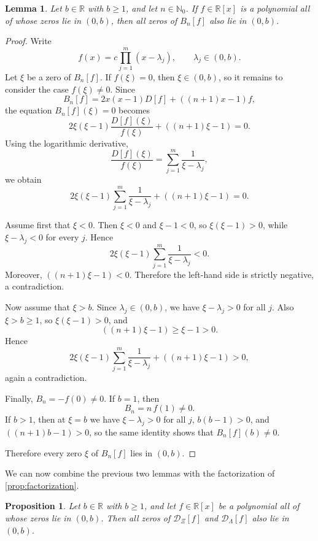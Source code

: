 \documentclass[11pt,twoside]{article}
\newtheorem{lemma}[theorem]{Lemma}
\newtheorem{proposition}[theorem]{Proposition}
\numberwithin{equation}{section}
\begin{document}
\begin{lemma}\label{lem:Bn-interval-0b}
Let \(b\in\mathbb R\) with \(b\ge 1\), and let \(n\in\mathbb N_0\). If \(f\in\mathbb R[x]\) is a polynomial all of whose zeros lie in \((0,b)\), then all zeros of \(B_n[f]\) also lie in \((0,b)\).
\end{lemma}

\begin{proof}
Write
\[
f(x)=c\prod_{j=1}^m (x-\lambda_j),
\qquad \lambda_j\in(0,b).
\]
Let \(\xi\) be a zero of \(B_n[f]\). If \(f(\xi)=0\), then \(\xi\in(0,b)\), so it remains to consider the case \(f(\xi)\neq 0\). Since
\[
B_n[f]=2x(x-1)D[f]+((n+1)x-1)f,
\]
the equation \(B_n[f](\xi)=0\) becomes
\[
2\xi(\xi-1)\frac{D[f](\xi)}{f(\xi)}+((n+1)\xi-1)=0.
\]
Using the logarithmic derivative,
\[
\frac{D[f](\xi)}{f(\xi)}
=
\sum_{j=1}^m \frac{1}{\xi-\lambda_j},
\]
we obtain
\[
2\xi(\xi-1)\sum_{j=1}^m \frac{1}{\xi-\lambda_j}+((n+1)\xi-1)=0.
\]

Assume first that \(\xi<0\). Then \(\xi<0\) and \(\xi-1<0\), so \(\xi(\xi-1)>0\), while \(\xi-\lambda_j<0\) for every \(j\). Hence
\[
2\xi(\xi-1)\sum_{j=1}^m \frac{1}{\xi-\lambda_j}<0.
\]
Moreover, \(((n+1)\xi-1)<0\). Therefore the left-hand side is strictly negative, a contradiction.

Now assume that \(\xi>b\). Since \(\lambda_j\in(0,b)\), we have \(\xi-\lambda_j>0\) for all \(j\). Also \(\xi>b\ge1\), so \(\xi(\xi-1)>0\), and
\[
((n+1)\xi-1)\ge \xi-1>0.
\]
Hence
\[
2\xi(\xi-1)\sum_{j=1}^m \frac{1}{\xi-\lambda_j}+((n+1)\xi-1)>0,
\]
again a contradiction.

Finally, \(B_n=-f(0)\neq0\). If \(b=1\), then
\[
B_n=n\,f(1)\neq0.
\]
If \(b>1\), then at \(\xi=b\) we have \(\xi-\lambda_j>0\) for all \(j\), \(b(b-1)>0\), and \(((n+1)b-1)>0\), so the same identity shows that \(B_n[f](b)\neq0\).

Therefore every zero \(\xi\) of \(B_n[f]\) lies in \((0,b)\).
\end{proof}

We can now combine the previous two lemmas with the factorization of \cref{prop:factorization}.

\begin{proposition}\label{prop:D-interval-0b}
Let \(b\in\mathbb R\) with \(b\ge 1\), and let \(f\in\mathbb R[x]\) be a polynomial all of whose zeros lie in \((0,b)\). Then all zeros of \(\mathcal D_{\Xi}[f]\) and \(\mathcal D_{\Lambda}[f]\) also lie in \((0,b)\).
\end{proposition}
\end{document}
